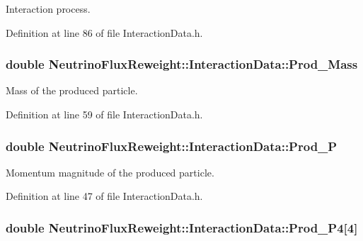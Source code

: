 Interaction process. 



Definition at line 86 of file Interaction\-Data.\-h.

\hypertarget{class_neutrino_flux_reweight_1_1_interaction_data_a635f8d931a62a5d8cdda2cf755f4f98a}{
\subsubsection[{Prod\-\_\-\-Mass}]{\setlength{\rightskip}{0pt plus 5cm}double Neutrino\-Flux\-Reweight\-::\-Interaction\-Data\-::\-Prod\-\_\-\-Mass}}\label{class_neutrino_flux_reweight_1_1_interaction_data_a635f8d931a62a5d8cdda2cf755f4f98a}


Mass of the produced particle. 



Definition at line 59 of file Interaction\-Data.\-h.

\hypertarget{class_neutrino_flux_reweight_1_1_interaction_data_a3fc5ae6cdef5d7883442abed079cc107}{
\subsubsection[{Prod\-\_\-\-P}]{\setlength{\rightskip}{0pt plus 5cm}double Neutrino\-Flux\-Reweight\-::\-Interaction\-Data\-::\-Prod\-\_\-\-P}}\label{class_neutrino_flux_reweight_1_1_interaction_data_a3fc5ae6cdef5d7883442abed079cc107}


Momentum magnitude of the produced particle. 



Definition at line 47 of file Interaction\-Data.\-h.

\hypertarget{class_neutrino_flux_reweight_1_1_interaction_data_aeb1a90172c41b31676c9b9f2587684b4}{
\subsubsection[{Prod\-\_\-\-P4}]{\setlength{\rightskip}{0pt plus 5cm}double Neutrino\-Flux\-Reweight\-::\-Interaction\-Data\-::\-Prod\-\_\-\-P4\mbox{[}4\mbox{]}}}\label{class_neutrino_flux_reweight_1_1_interaction_data_aeb1a90172c41b31676c9b9f2587684b4}


